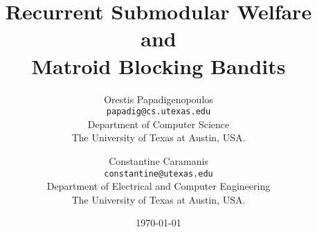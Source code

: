 \documentclass[11pt]{article}
\title{Recurrent Submodular Welfare and \\
Matroid Blocking Bandits}
\author{
Orestis Papadigenopoulos\\
\texttt{papadig@cs.utexas.edu}\\
Department of Computer Science\\
The University of Texas at Austin, USA.
\and
Constantine Caramanis\\
\texttt{constantine@utexas.edu}\\
Department of Electrical and Computer Engineering\\
The University of Texas at Austin, USA.
}
\date{\today}
\begin{document}
\maketitle


\begin{abstract}

\end{abstract}













\newpage
\appendix




\end{document}
